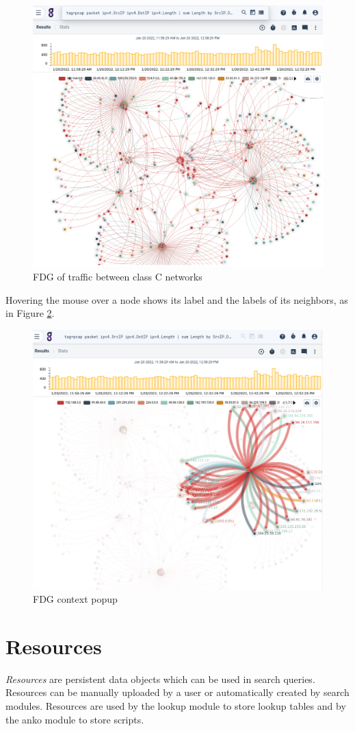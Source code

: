 \begin{figure}
	\includegraphics[width=0.6\linewidth]{images/fdg-classC.png}
	\caption{FDG of traffic between class C networks}
	\label{fig:fdg-classC}
\end{figure}

Hovering the mouse over a node shows its label and the labels of its
neighbors, as in Figure \ref{fig:fdg-context}.

\begin{figure}
	\includegraphics[width=0.6\linewidth]{images/fdg-context.png}
	\caption{FDG context popup}
	\label{fig:fdg-context}
\end{figure}

\clearpage
\section{Resources}
\label{sec:resources}
\emph{Resources} are persistent data objects which can be used in search
queries. Resources can be manually uploaded by a user or automatically
created by search modules. Resources are used by the lookup module to
store lookup tables and by the anko module to store scripts.

